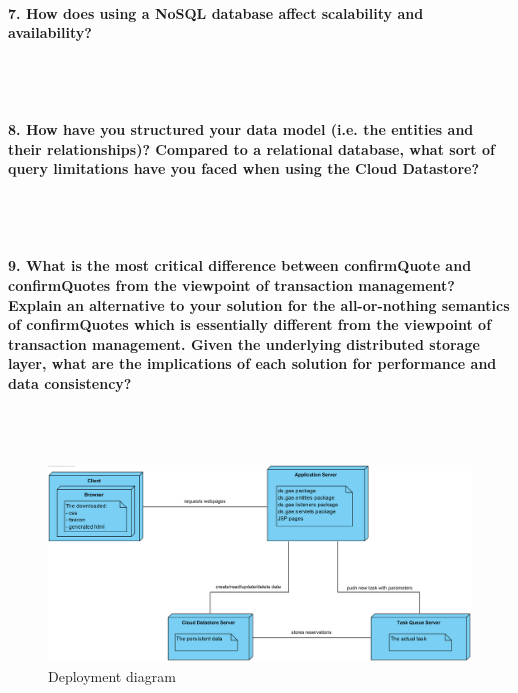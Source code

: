 \documentclass{ds-report}
\begin{document}
 

	\paragraph{7.  How does using a NoSQL database affect scalability and availability?} \mbox{}\\\\




	\paragraph{8. How have you structured your data model (i.e. the entities and their relationships)? Compared to a relational database, what sort of query limitations have you faced when using the Cloud Datastore?} \mbox{}\\\\


	\paragraph{9. What is the most critical difference between confirmQuote and confirmQuotes from the viewpoint of transaction management? Explain an alternative to your solution for the all-or-nothing semantics of confirmQuotes which is essentially different from the viewpoint of transaction management. Given the underlying distributed storage layer, what are the implications of each solution for performance and data consistency?} \mbox{}\\\\
	
		\clearpage

\begin{figure}
  \includegraphics[width=\linewidth]{GAE_opdracht_2_deployment.png}
  \caption{Deployment diagram}
  \label{fig:deployment_diagram}
\end{figure}	

	
	\clearpage


	
\end{document}
